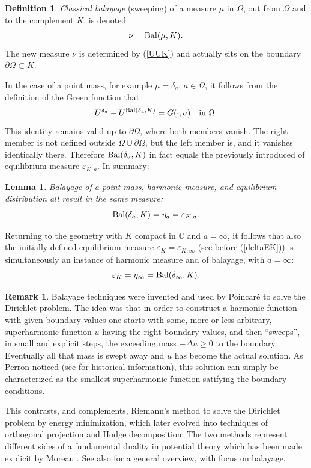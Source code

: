 \documentclass[reqno,12pt]{article}
\theoremstyle{plain}
\newtheorem{lemma}[thm]{Lemma}
\theoremstyle{definition}
\newtheorem{definition}{Definition}[section]
\newtheorem{remark}[defn]{Remark}
\numberwithin{equation}{section}
\numberwithin{figure}{section}
\def\C{{\mathbb C}}
\begin{document}
\begin{definition}\label{def:BalK}
{\it Classical balayage} (sweeping) of a measure $\mu$ in $\Omega$, out from $\Omega$
and to the complement $K$, is denoted
\begin{equation}\label{notationBal}
\nu={\rm Bal} (\mu, K).
\end{equation}
The new measure $\nu$ is determined by (\ref{UUK}) and actually sits on the boundary $\partial\Omega\subset K$.
\end{definition}
In the case of a point mass, for example $\mu=\delta_a$, $a\in\Omega$, 
it follows from the definition of the Green function that 
$$
U^{\delta_a}-U^{{\rm Bal}(\delta_a, K)}=G(\cdot,a) \quad \text{in } \Omega.
$$
This identity remains valid up to $\partial \Omega$, where both members vanish.
The right member is not defined outside
$\Omega\cup\partial\Omega$, but the left member is, and it vanishes identically there.  
Therefore ${\rm Bal}(\delta_a,K)$ in fact equals the previously introduced of equilibrium measure $\varepsilon_{K,a}$.
In summary:
\begin{lemma}
Balayage of a point mass, harmonic measure, and equilibrium distribution all result in the same measure:
\begin{equation}\label{BaldeltaKeta}
{\rm Bal}(\delta_a, K)=\eta_a=\varepsilon_{K,a}.
\end{equation}
\end{lemma}

Returning to the geometry with $K$ compact in $\C$ and $a=\infty$, 
it follows that also the initially defined equilibrium measure $\varepsilon_K=\varepsilon_{K,\infty}$
(see before (\ref{deltaEK}))
is simultaneously an instance of harmonic measure and of balayage, with $a=\infty$: 
$$
\varepsilon_K=\eta_\infty={\rm Bal}(\delta_\infty, K).
$$

\begin{remark}\label{rem:phil}
Balayage techniques were invented and used by Poincar\'{e} to solve the Dirichlet problem.
The idea was that in order to construct a harmonic function with given boundary values one starts with some, 
more or less arbitrary, superharmonic function $u$ having the right boundary values, and then ``sweeps'', in small and
explicit steps, the exceeding mass $-\Delta u\geq 0$ to the boundary. Eventually all that mass is swept away
and $u$ has become the actual solution. As Perron noticed (see \cite{Doob-1984} for historical information), 
this solution can simply be 
characterized as the smallest superharmonic function satifying the boundary conditions.

This contrasts, and complements, Riemann's method to solve the Dirichlet problem by energy minimization, which
later evolved into techniques of orthogonal projection and Hodge decomposition.
The two methods represent different sides of a fundamental duality in potential theory which has been made
explicit by Moreau \cite{Moreau-1962}.  See also \cite{Gustafsson-2004} for a general overview, with focus on balayage.
\end{remark} 
\end{document}

